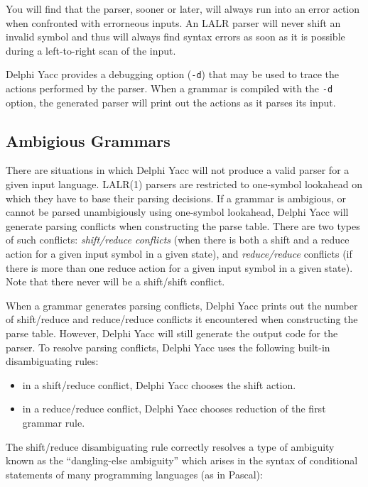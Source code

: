 \documentclass{article}
\begin{document}
You will find that the parser, sooner or later, will always run into an
error action when confronted with errorneous inputs. An LALR parser will
never shift an invalid symbol and thus will always find syntax errors as
soon as it is possible during a left-to-right scan of the input.

Delphi Yacc provides a debugging option (\verb"-d") that may be used to trace
the actions performed by the parser. When a grammar is compiled with the
\verb"-d" option, the generated parser will print out the actions as it
parses its input.

\subsection{Ambigious Grammars}

There are situations in which Delphi Yacc will not produce a valid parser for
a given input language. LALR(1) parsers are restricted to one-symbol
lookahead on which they have to base their parsing decisions. If a
grammar is ambigious, or cannot be parsed unambigiously using one-symbol
lookahead, Delphi Yacc will generate parsing conflicts when constructing the
parse table. There are two types of such conflicts: {\em shift/reduce
conflicts\/} (when there is both a shift and a reduce action for a given
input symbol in a given state), and {\em reduce/reduce\/} conflicts (if
there is more than one reduce action for a given input symbol in a given
state). Note that there never will be a shift/shift conflict.

When a grammar generates parsing conflicts, Delphi Yacc prints out the number
of shift/reduce and reduce/reduce conflicts it encountered when constructing
the parse table. However, Delphi Yacc will still generate the output code for the
parser. To resolve parsing conflicts, Delphi Yacc uses the following built-in
disambiguating rules:

\begin{itemize}
   \item
      in a shift/reduce conflict, Delphi Yacc chooses the shift action.
   \item
      in a reduce/reduce conflict, Delphi Yacc chooses reduction of the first
      grammar rule.
\end{itemize}

The shift/reduce disambiguating rule correctly resolves a type of
ambiguity known as the ``dangling-else ambiguity'' which arises in the
syntax of conditional statements of many programming languages (as in
Pascal):
\end{document}
